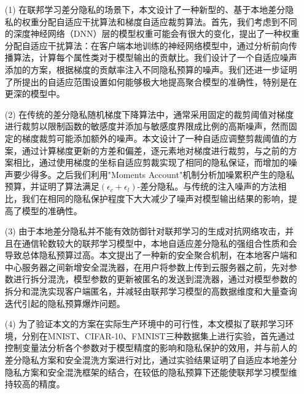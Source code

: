 \begin{enumerate}
\item [(1)] 在联邦学习差分隐私的场景下，本文设计了一种新型的、基于本地差分隐私的权重分配自适应干扰算法和梯度自适应裁剪算法。首先，我们考虑到不同的深度神经网络（DNN）层的模型权重可能会有很大的变化，提出了一种权重分配自适应干扰算法：在客户端本地训练的神经网络模型中，通过分析前向传播算法，计算每个属性类对于模型输出的贡献比。我们设计了一个自适应噪声添加的方案，根据梯度的贡献率注入不同隐私预算的噪声。我们还进一步证明了所提出的自适应范围设置如何能够极大地提高聚合模型的准确性，特别是在更深的模型中。

\item [(2)]在传统的差分隐私随机梯度下降算法中，通常采用固定的裁剪阈值对梯度进行裁剪以限制函数的敏感度并添加与敏感度界限成比例的高斯噪声，然而固定的梯度裁剪可能添加额外的噪声。本文设计了一种自适应调整剪裁阈值的方案，通过计算梯度更新的方差和偏差，逐元素地对梯度进行裁剪，与之前的方案相比，通过使用梯度的坐标自适应剪裁实现了相同的隐私保证，而增加的噪声要少得多。之后我们利用"Moments Account"机制分析加噪累积产生的隐私预算，并证明了算法满足$\left(\epsilon_{c}+\epsilon_{l}\right)$-差分隐私。与传统的注入噪声的方法相比，我们在相同的隐私保护程度下大大减少了噪声对模型输出结果的影响，提高了模型的准确性。

\item [(3)] 由于本地差分隐私并不能有效防御针对联邦学习的生成对抗网络攻击，并且在通信轮数较大的联邦学习模型中，本地自适应差分隐私的强组合性质和会导致总体隐私预算过高。本文提出了一种新的安全聚合机制，在本地客户端和中心服务器之间新增安全混洗器，在用户将参数上传到云服务器之前，先对参数进行拆分混洗，模型参数的更新被匿名的发送到混洗器，通过对模型参数的拆分和混洗实现客户端匿名，并减轻由联邦学习模型的高数据维度和大量查询迭代引起的隐私预算爆炸问题。

\item [(4)] 为了验证本文的方案在实际生产环境中的可行性，本文模拟了联邦学习环境，分别在MNIST、CIFAR-10、FMNIST三种数据集上进行实验，首先通过控制变量法分析各个参数对于模型精度的影响和隐私保护的效用，并与前人的差分隐私方案和安全混洗方案进行对比，通过实验结果证明了自适应本地差分隐私方案和安全混洗框架的结合，在较低的隐私预算下还能使联邦学习模型维持较高的精度。
\end{enumerate}
\hspace{-0.5cm}
 
